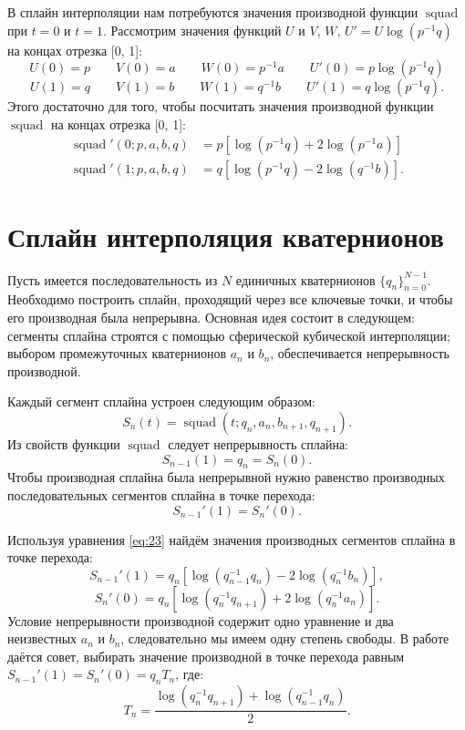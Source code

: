 \documentclass[draft]{article}
\DeclareMathOperator{\squad}{squad}
\begin{document}
В сплайн интерполяции 
нам потребуются значения производной функции $\squad$ при $t = 0$ и $t = 1$. Рассмотрим значения функций $U$ и $V$, $W$, $U' = U \log(p^{-1} q)$ на концах отрезка [0, 1]:
\[ U(0) = p \qquad V(0) = a \qquad W(0) = p^{-1} a \qquad U'(0) = p \log(p^{-1} q) \]
\[ U(1) = q \qquad V(1) = b \qquad W(1) = q^{-1} b \qquad U'(1) = q \log(p^{-1} q) .\]
Этого достаточно для того, чтобы посчитать значения производной функции $\squad$ на концах отрезка [0, 1]:
\begin{equation}
\label{eq:23}
\begin{split}
\squad'(0; p, a, b, q) & = p[\log(p^{-1}q) + 2\log(p^{-1}a)] \\
\squad'(1; p, a, b, q) & = q[\log(p^{-1}q) - 2\log(q^{-1}b)] .
\end{split}
\end{equation}

\section{Сплайн интерполяция кватернионов}

Пусть имеется последовательность из $N$ единичных кватернионов $\{q_n\}^{N - 1}_{n = 0}.$ Необходимо построить сплайн, проходящий через все ключевые точки, и чтобы его производная была непрерывна. Основная идея состоит в следующем: сегменты сплайна строятся с помощью сферической кубической интерполяции; выбором промежуточных кватернионов $a_n$ и $b_n$, обеспечивается непрерывность производной. 

Каждый сегмент сплайна устроен следующим образом:
\begin{equation}
\label{eq:24}
S_n(t) = \squad(t; q_n, a_n, b_{n + 1}, q_{n + 1}).
\end{equation}
Из свойств функции $\squad$ следует непрерывность сплайна: 
\[ S_{n - 1}(1) = q_n = S_n(0). \]
Чтобы производная сплайна была непрерывной нужно равенство производных последовательных сегментов сплайна в точке перехода:
\[ S_{n - 1}'(1) = S_n'(0) .\]

Используя уравнения \ref{eq:23} найдём значения производных сегментов сплайна в точке перехода: 
\[ S_{n - 1}'(1) = q_n [\log(q_{n - 1}^{-1} q_n) - 2 \log(q_n^{-1} b_n)], \]
\[ S_n'(0) = q_n [\log(q_n^{-1} q_{n + 1}) + 2 \log(q_n^{-1} a_n)] .\]
Условие непрерывности производной содержит одно уравнение и два неизвестных $a_n$ и $b_n$, следовательно мы имеем одну степень свободы. В работе \cite{KenShoemake} даётся совет, выбирать значение производной в точке перехода
равным $S_{n - 1}'(1) = S_n'(0) = q_n T_n$, где:
\[ T_n = \frac{\log(q_n^{-1} q_{n + 1}) + \log(q_{n-1}^{-1} q_n)}{2} . \]
\end{document}
